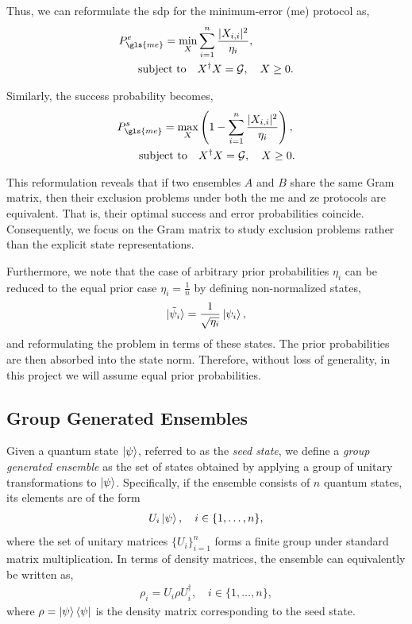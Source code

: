 \documentclass[12pt,letterpaper]{article}
\begin{document}
\begin{multicols}{2}
Thus, we can reformulate the \gls{sdp} for the minimum-error (\gls{me}) protocol as,
\begin{align*}
	P_{\gls{me}}^e = \min_{X} &\sum_{i=1}^n \frac{|X_{i,i}|^2}{\eta_i}, \\
	\text{subject to} \quad & X^\dagger X = \mathcal{G}, \quad X \geq 0.
\end{align*}

Similarly, the success probability becomes,
\begin{align*}
	P_{\gls{me}}^s = \max_{X} &\left( 1 - \sum_{i=1}^n \frac{|X_{i,i}|^2}{\eta_i} \right), \\
	\text{subject to} \quad & X^\dagger X = \mathcal{G}, \quad X \geq 0.
\end{align*}

This reformulation reveals that if two ensembles $A$ and $B$ share the same Gram matrix, then their exclusion problems under both the \gls{me} and \gls{ze} protocols are equivalent. That is, their optimal success and error probabilities coincide. Consequently, we focus on the Gram matrix to study exclusion problems rather than the explicit state representations.

Furthermore, we note that the case of arbitrary prior probabilities $\eta_i$ can be reduced to the equal prior case $\eta_i = \frac{1}{n}$ by defining non-normalized states,
\begin{align*}
	\ket{\tilde{\psi}_i} = \frac{1}{\sqrt{\eta_i}} \ket{\psi_i},
\end{align*}
and reformulating the problem in terms of these states. The prior probabilities are then absorbed into the state norm. Therefore, without loss of generality, in this project we will assume equal prior probabilities.

\subsection{Group Generated Ensembles}\label{sectionGroupGeneratedEnsemble}

Given a quantum state $\ket{\psi}$, referred to as the \emph{seed state}, we define a \emph{group generated ensemble} as the set of states obtained by applying a group of unitary transformations to $\ket{\psi}$. Specifically, if the ensemble consists of $n$ quantum states, its elements are of the form
\begin{align*}
	U_i\ket{\psi}, \quad i \in \{1, \dots, n\},
\end{align*}
where the set of unitary matrices $\{U_i\}_{i=1}^n$ forms a finite group under standard matrix multiplication. In terms of density matrices, the ensemble can equivalently be written as,
\begin{align*}
	\rho_i = U_i \rho U_i^\dagger, \quad i \in \{1, \dots, n\},
\end{align*}
where $\rho = \ket{\psi}\bra{\psi}$ is the density matrix corresponding to the seed state.


\end{multicols}
\end{document}
